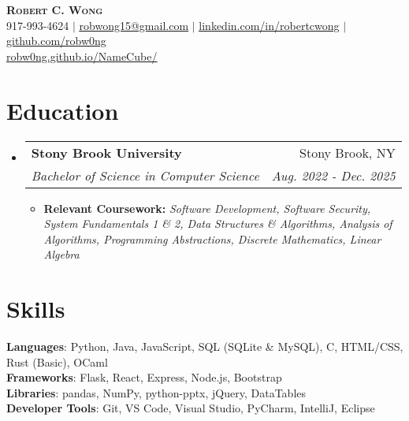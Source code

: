 \documentclass[letterpaper,11pt]{article}
\makeatletter
\newcommand{\resumeSubheading}[4]{
    \vspace{-2pt}\item
      \begin{tabular*}{0.97\textwidth}[t]{l@{\extracolsep{\fill}}r}
        \textbf{#1} & #2 \\
        \textit{\small#3} & \textit{\small #4} \\
      \end{tabular*}\vspace{-7pt}
  }
\newcommand{\resumeSubHeadingListStart}{\begin{itemize}[leftmargin=0.15in, label={}]}
\newcommand{\resumeSubHeadingListEnd}{\end{itemize}}
\makeatother
\begin{document}
\begin{center}
  \textbf{\Huge \scshape Robert C. Wong} \\ \vspace{1pt}
  \small 917-993-4624 $|$ \href{mailto:robwon15@gmail.com}{\underline{robwong15@gmail.com}} $|$
  \href{https://linkedin.com/in/robertcwong}{\underline{linkedin.com/in/robertcwong}} $|$
  \href{https://github.com/robw0ng/}{\underline{github.com/robw0ng}}
  \\
  \href{https://robw0ng.github.io/NameCube/}{\underline{robw0ng.github.io/NameCube/}}

\end{center}

\section{Education}
\resumeSubHeadingListStart
\resumeSubheading
{Stony Brook University}{Stony Brook, NY}
{Bachelor of Science in Computer Science}{Aug. 2022 - Dec. 2025}
\begin{itemize}[leftmargin=0.15in, label={}, itemsep=10pt, topsep=5pt, parsep=0pt, partopsep=0pt]
  \item \small{\textbf{Relevant Coursework:} \textit{Software Development, Software Security, System Fundamentals 1 \& 2, Data Structures \& Algorithms, Analysis of Algorithms, Programming Abstractions, Discrete Mathematics, Linear Algebra}}
\end{itemize}
\resumeSubHeadingListEnd
\vspace{-12pt}

\section{Skills}
\begin{itemize}[leftmargin=0.15in, label={}]
  \small{\item{
        \textbf{Languages}{: Python, Java, JavaScript, SQL (SQLite \& MySQL), C, HTML/CSS, Rust (Basic), OCaml} \\
        \textbf{Frameworks}{: Flask, React, Express, Node.js, Bootstrap} \\
        \textbf{Libraries}{: pandas, NumPy, python-pptx, jQuery, DataTables} \\
        \textbf{Developer Tools}{: Git, VS Code, Visual Studio, PyCharm, IntelliJ, Eclipse} \\
        }}
\end{itemize}
\vspace{-12pt}
\end{document}
